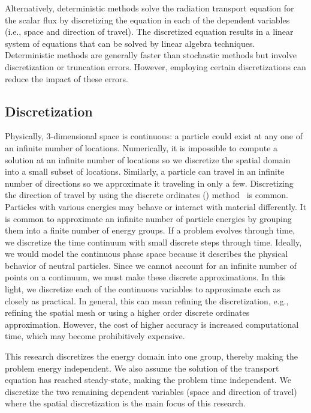 \documentclass{article}
\begin{document}
Alternatively, deterministic methods solve the radiation transport equation for the scalar flux by discretizing the equation in each of the dependent variables (i.e., space and direction of travel). The discretized equation results in a linear system of equations that can be solved by linear algebra techniques. Deterministic methods are generally faster than stochastic methods but involve discretization or truncation errors. However, employing certain discretizations can reduce the impact of these errors.

\subsection{Discretization}
\label{sec:DiscretizationIntro}

Physically, 3-dimensional space is continuous: a particle could exist at any one of an infinite number of locations. Numerically, it is impossible to compute a solution at an infinite number of locations so we discretize the spatial domain into a small subset of locations. Similarly, a particle can travel in an infinite number of directions so we approximate it traveling in only a few. Discretizing the direction of travel by using the discrete ordinates (\SN) method~\cite{discrete_ordinates} is common. Particles with various energies may behave or interact with material differently. It is common to approximate an infinite number of particle energies by grouping them into a finite number of energy groups. If a problem evolves through time, we discretize the time continuum with small discrete steps through time. Ideally, we would model the continuous phase space because it describes the physical behavior of neutral particles. Since we cannot account for an infinite number of points on a continuum, we must make these discrete approximations. In this light, we discretize each of the continuous variables to approximate each as closely as practical. In general, this can mean refining the discretization, e.g., refining the spatial mesh or using a higher order discrete ordinates approximation. However, the cost of higher accuracy is increased computational time, which may become prohibitively expensive.

This research discretizes the energy domain into one group, thereby making the problem energy independent. We also assume the solution of the transport equation has reached steady-state, making the problem time independent. We discretize the two remaining dependent variables (space and direction of travel) where the spatial discretization is the main focus of this research.
\end{document}
